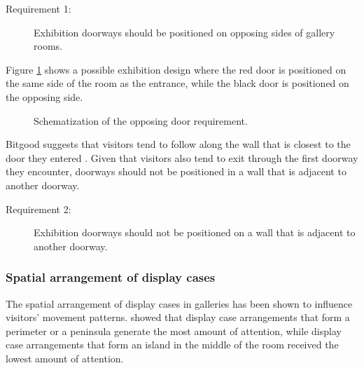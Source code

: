 \documentclass[12pt]{ucthesis}
\begin{document}
\begin{description}
\item[Requirement 1:] Exhibition doorways should be positioned on opposing sides of gallery rooms. 
\end{description}

Figure \ref{door-position} shows a possible exhibition design where the red door is positioned on the same side of the room as the entrance, while the black door is positioned on the opposing side.
\begin{figure}[H]
\centering
{}
\caption{Schematization of the opposing door requirement.}
\label{door-position}
\end{figure}

Bitgood suggests that visitors tend to follow along the wall that is closest to the door they entered \cite{Bitgood95}. Given that visitors also tend to exit through the first doorway they encounter, doorways should not be positioned in a wall that is adjacent to another doorway.  
 
\begin{description}
\item[Requirement 2:] Exhibition doorways should not be positioned on a wall that is adjacent to another doorway.
\end{description}


\subsubsection{Spatial arrangement of display cases}
The spatial arrangement of display cases in galleries has been shown to influence visitors' movement patterns. \cite{Bitgood92} showed that display case arrangements that form a perimeter or a peninsula generate the most amount of attention, while display case arrangements that form an island in the middle of the room received the lowest amount of attention.
\end{document}
